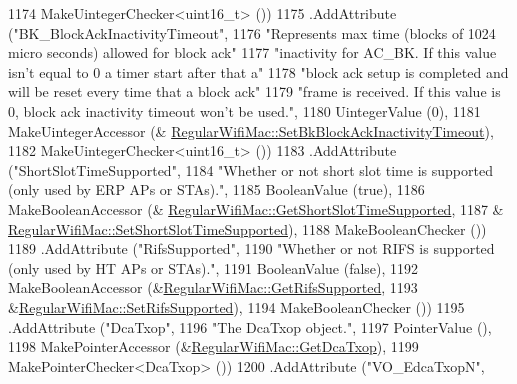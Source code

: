 \begin{DoxyCode}
1174                    MakeUintegerChecker<uint16\_t> ())
1175     .AddAttribute (\textcolor{stringliteral}{"BK\_BlockAckInactivityTimeout"},
1176                    \textcolor{stringliteral}{"Represents max time (blocks of 1024 micro seconds) allowed for block ack"}
1177                    \textcolor{stringliteral}{"inactivity for AC\_BK. If this value isn't equal to 0 a timer start after that a"}
1178                    \textcolor{stringliteral}{"block ack setup is completed and will be reset every time that a block ack"}
1179                    \textcolor{stringliteral}{"frame is received. If this value is 0, block ack inactivity timeout won't be used."},
1180                    UintegerValue (0),
1181                    MakeUintegerAccessor (&
      \hyperlink{classns3_1_1RegularWifiMac_a4b4ae1db15dff48d6cf70eb9435677f9}{RegularWifiMac::SetBkBlockAckInactivityTimeout}),
1182                    MakeUintegerChecker<uint16\_t> ())
1183     .AddAttribute (\textcolor{stringliteral}{"ShortSlotTimeSupported"},
1184                    \textcolor{stringliteral}{"Whether or not short slot time is supported (only used by ERP APs or STAs)."},
1185                    BooleanValue (\textcolor{keyword}{true}),
1186                    MakeBooleanAccessor (&
      \hyperlink{classns3_1_1RegularWifiMac_a05ec5d1fa4fffd5067a811d3bc1ddd72}{RegularWifiMac::GetShortSlotTimeSupported},
1187                                         &
      \hyperlink{classns3_1_1RegularWifiMac_a0c36150e82bb7a83ea390d89621de0d5}{RegularWifiMac::SetShortSlotTimeSupported}),
1188                    MakeBooleanChecker ())
1189     .AddAttribute (\textcolor{stringliteral}{"RifsSupported"},
1190                    \textcolor{stringliteral}{"Whether or not RIFS is supported (only used by HT APs or STAs)."},
1191                    BooleanValue (\textcolor{keyword}{false}),
1192                    MakeBooleanAccessor (&\hyperlink{classns3_1_1RegularWifiMac_aee913cae11540b2878873ca3ac968afc}{RegularWifiMac::GetRifsSupported},
1193                                         &\hyperlink{classns3_1_1RegularWifiMac_aeaf976acb7d73b023ad9d554bdf68bc9}{RegularWifiMac::SetRifsSupported}),
1194                    MakeBooleanChecker ())
1195     .AddAttribute (\textcolor{stringliteral}{"DcaTxop"},
1196                    \textcolor{stringliteral}{"The DcaTxop object."},
1197                    PointerValue (),
1198                    MakePointerAccessor (&\hyperlink{classns3_1_1RegularWifiMac_aad5cb47bce94b2deafb52a6d39b0a172}{RegularWifiMac::GetDcaTxop}),
1199                    MakePointerChecker<DcaTxop> ())
1200     .AddAttribute (\textcolor{stringliteral}{"VO\_EdcaTxopN"},

\end{DoxyCode}
